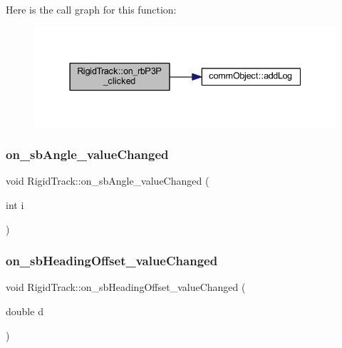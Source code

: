 Here is the call graph for this function\+:
\nopagebreak
\begin{figure}[H]
\begin{center}
\leavevmode
\includegraphics[width=337pt]{class_rigid_track_ac1f10ea5ec3f718c152e245a04776454_cgraph}
\end{center}
\end{figure}
\mbox{\label{class_rigid_track_a217ca3d828c99943ea155e6891264b24}} 
\subsubsection{\texorpdfstring{on\+\_\+sb\+Angle\+\_\+value\+Changed}{on\_sbAngle\_valueChanged}}
{\footnotesize\ttfamily void Rigid\+Track\+::on\+\_\+sb\+Angle\+\_\+value\+Changed (\begin{DoxyParamCaption}\item[{int}]{i }\end{DoxyParamCaption})\hspace{0.3cm}{\ttfamily [slot]}}

\mbox{\label{class_rigid_track_a72e338d6bf93d0efa3bc503f7ca736c5}} 
\subsubsection{\texorpdfstring{on\+\_\+sb\+Heading\+Offset\+\_\+value\+Changed}{on\_sbHeadingOffset\_valueChanged}}
{\footnotesize\ttfamily void Rigid\+Track\+::on\+\_\+sb\+Heading\+Offset\+\_\+value\+Changed (\begin{DoxyParamCaption}\item[{double}]{d }\end{DoxyParamCaption})\hspace{0.3cm}{\ttfamily [slot]}}

